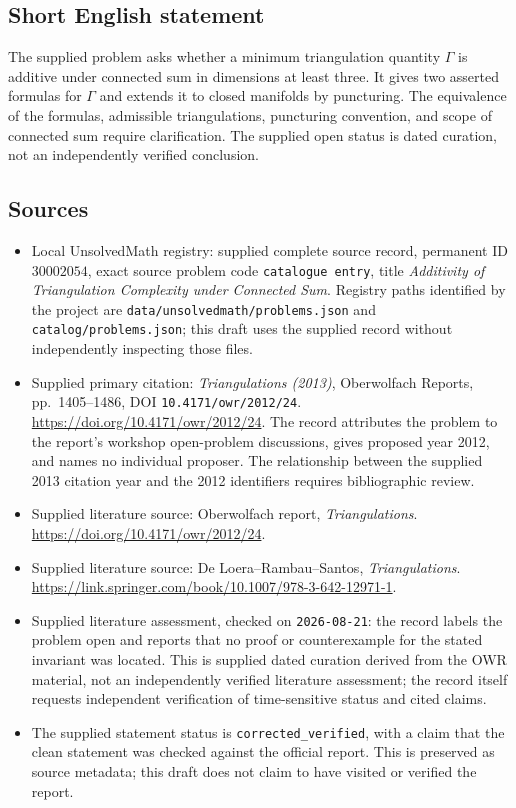 \documentclass[11pt]{article}
\begin{document}
\subsection{Short English statement}
The supplied problem asks whether a minimum triangulation quantity \(\Gamma\) is additive under connected sum in dimensions at least three. It gives two asserted formulas for \(\Gamma\) and extends it to closed manifolds by puncturing. The equivalence of the formulas, admissible triangulations, puncturing convention, and scope of connected sum require clarification. The supplied open status is dated curation, not an independently verified conclusion.
\subsection{Sources}
\begin{itemize}
\item Local UnsolvedMath registry: supplied complete source record, permanent ID \(30002054\), exact source problem code \texttt{catalogue entry}, title \emph{Additivity of Triangulation Complexity under Connected Sum}. Registry paths identified by the project are \texttt{data/unsolvedmath/problems.json} and \texttt{catalog/problems.json}; this draft uses the supplied record without independently inspecting those files.
\item Supplied primary citation: \emph{Triangulations (2013)}, Oberwolfach Reports, pp.~1405--1486, DOI \texttt{10.4171/owr/2012/24}. \url{https://doi.org/10.4171/owr/2012/24}. The record attributes the problem to the report's workshop open-problem discussions, gives proposed year 2012, and names no individual proposer. The relationship between the supplied 2013 citation year and the 2012 identifiers requires bibliographic review.
\item Supplied literature source: Oberwolfach report, \emph{Triangulations}. \url{https://doi.org/10.4171/owr/2012/24}.
\item Supplied literature source: De Loera--Rambau--Santos, \emph{Triangulations}. \url{https://link.springer.com/book/10.1007/978-3-642-12971-1}.
\item Supplied literature assessment, checked on \texttt{2026-08-21}: the record labels the problem open and reports that no proof or counterexample for the stated invariant was located. This is supplied dated curation derived from the OWR material, not an independently verified literature assessment; the record itself requests independent verification of time-sensitive status and cited claims.
\item The supplied statement status is \texttt{corrected\_verified}, with a claim that the clean statement was checked against the official report. This is preserved as source metadata; this draft does not claim to have visited or verified the report.
\end{itemize}
\end{document}
